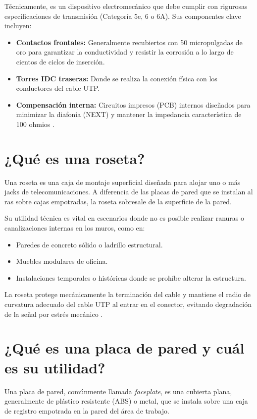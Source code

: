 \documentclass[a4paper,12pt]{article}
\begin{document}
Técnicamente, es un dispositivo electromecánico que debe cumplir con rigurosas especificaciones de transmisión (Categoría 5e, 6 o 6A). Sus componentes clave incluyen:
\begin{itemize}
    \item \textbf{Contactos frontales:} Generalmente recubiertos con 50 micropulgadas de oro para garantizar la conductividad y resistir la corrosión a lo largo de cientos de ciclos de inserción.
    \item \textbf{Torres IDC traseras:} Donde se realiza la conexión física con los conductores del cable UTP.
    \item \textbf{Compensación interna:} Circuitos impresos (PCB) internos diseñados para minimizar la diafonía (NEXT) y mantener la impedancia característica de 100 ohmios \cite{udenar}.
\end{itemize}

\section{¿Qué es una roseta?}

Una roseta es una caja de montaje superficial diseñada para alojar uno o más jacks de telecomunicaciones. A diferencia de las placas de pared que se instalan al ras sobre cajas empotradas, la roseta sobresale de la superficie de la pared.

Su utilidad técnica es vital en escenarios donde no es posible realizar ranuras o canalizaciones internas en los muros, como en:
\begin{itemize}
    \item Paredes de concreto sólido o ladrillo estructural.
    \item Muebles modulares de oficina.
    \item Instalaciones temporales o históricas donde se prohíbe alterar la estructura.
\end{itemize}
La roseta protege mecánicamente la terminación del cable y mantiene el radio de curvatura adecuado del cable UTP al entrar en el conector, evitando degradación de la señal por estrés mecánico \cite{mercadolibre}.

\section{¿Qué es una placa de pared y cuál es su utilidad?}

Una placa de pared, comúnmente llamada \textit{faceplate}, es una cubierta plana, generalmente de plástico resistente (ABS) o metal, que se instala sobre una caja de registro empotrada en la pared del área de trabajo.
\end{document}
